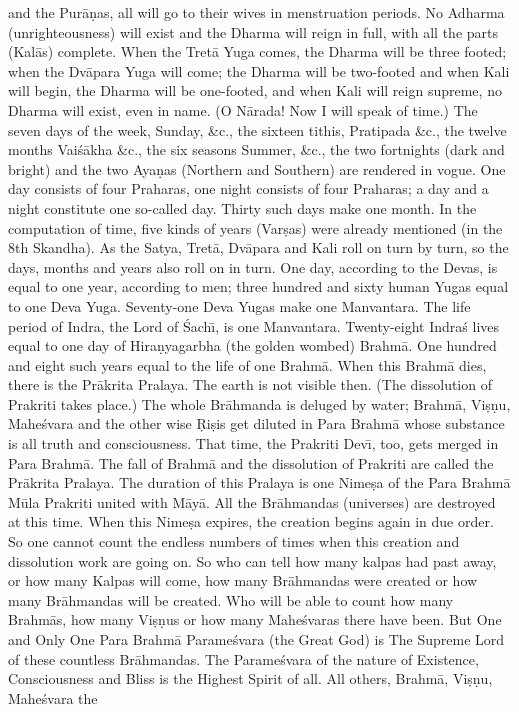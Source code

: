 and the Pur\=a\d{n}as, all will go to their wives in menstruation periods. No Adharma (unrighteousness) will exist and the Dharma will reign in full, with all the parts (Kal\=as) complete. When the Tret\=a Yuga comes, the Dharma will be three footed; when the Dv\=apara Yuga will come; the Dharma will be two-footed and when Kali will begin, the Dharma will be one-footed, and when Kali will reign supreme, no Dharma will exist, even in name. (O N\=arada! Now I will speak of time.) The seven days of the week, Sunday, \&c., the sixteen tithis, Pratipada \&c., the twelve months Vai\'s\=akha \&c., the six seasons Summer, \&c., the two fortnights (dark and bright) and the two Aya\d{n}as (Northern and Southern) are rendered in vogue. One day consists of four Praharas, one night consists of four Praharas; a day and a night constitute one so-called day. Thirty such days make one month. In the computation of time, five kinds of years (Var\d{s}as) were already mentioned (in the 8th Skandha). As the Satya, Tret\=a, Dv\=apara and Kali roll on turn by turn, so the days, months and years also roll on in turn. One day, according to the Devas, is equal to one year, according to men; three hundred and sixty human Yugas equal to one Deva Yuga. Seventy-one Deva Yugas make one Manvantara. The life period of Indra, the Lord of \'Sach\={\i}, is one Manvantara. Twenty-eight Indra\'s lives equal to one day of Hira\d{n}yagarbha (the golden wombed) Brahm\=a. One hundred and eight such years equal to the life of one Brahm\=a. When this Brahm\=a dies, there is the Pr\=akrita Pralaya. The earth is not visible then. (The dissolution of Prakriti takes place.) The whole Br\=ahmanda is deluged by water; Brahm\=a, Vi\d{s}\d{n}u, Mahe\'svara and the other wise \d{R}i\d{s}is get diluted in Para Brahm\=a whose substance is all truth and consciousness. That time, the Prakriti Dev\={\i}, too, gets merged in Para Brahm\=a. The fall of Brahm\=a and the dissolution of Prakriti are called the Pr\=akrita Pralaya. The duration of this Pralaya is one Nime\d{s}a of the Para Brahm\=a M\=ula Prakriti united with M\=ay\=a. All the Br\=ahmandas (universes) are destroyed at this time. When this Nime\d{s}a expires, the creation begins again in due order. So one cannot count the endless numbers of times when this creation and dissolution work are going on. So who can tell how many kalpas had past away, or how many Kalpas will come, how many Br\=ahmandas were created or how many Br\=ahmandas will be created. Who will be able to count how many Brahm\=as, how many Vi\d{s}\d{n}us or how many Mahe\'svaras there have been. But One and Only One Para Brahm\=a Parame\'svara (the Great God) is The Supreme Lord of these countless Br\=ahmandas. The Parame\'svara of the nature of Existence, Consciousness and Bliss is the Highest Spirit of all. All others, Brahm\=a, Vi\d{s}\d{n}u, Mahe\'svara the

